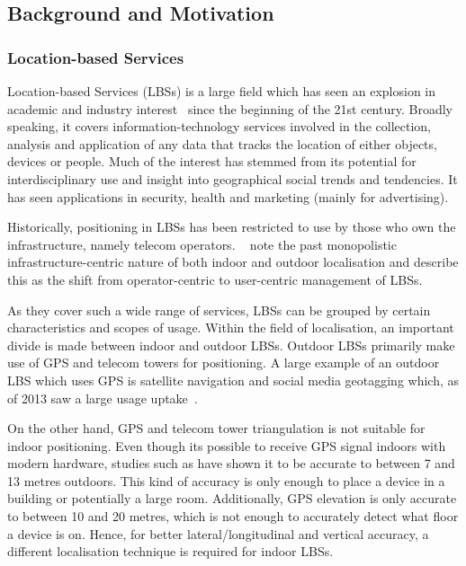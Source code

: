 
\subsection{Background and Motivation}\label{sec:motivation-and-background}

\subsubsection{Location-based Services}\label{sec:location-based-services}

Location-based Services (LBSs) is a large field which has seen an explosion in academic and industry interest~\cite{Junglas2008} since the beginning of the 21st century.
Broadly speaking, it covers information-technology services involved in the collection, analysis and application of any data that tracks the location of either objects, devices or people.
Much of the interest has stemmed from its potential for interdisciplinary use and insight into geographical social trends and tendencies.
It has seen applications in security, health and marketing (mainly for advertising).

Historically, positioning in LBSs has been restricted to use by those who own the infrastructure, namely telecom operators.
~ note the past monopolistic infrastructure-centric nature of both indoor and outdoor localisation and describe this as the shift from operator-centric to user-centric management of LBSs.

As they cover such a wide range of services, LBSs can be grouped by certain characteristics and scopes of usage.
Within the field of localisation, an important divide is made between indoor and outdoor LBSs.
Outdoor LBSs primarily make use of GPS and telecom towers for positioning.
A large example of an outdoor LBS which uses GPS is satellite navigation and social media geotagging which, as of 2013 saw a large usage uptake~\cite{zickuhr2013}.

On the other hand, GPS and telecom tower triangulation is not suitable for indoor positioning.
Even though its possible to receive GPS signal indoors with modern hardware, studies such as \cite{merry2019smartphone} have shown it to be accurate to between 7 and 13 metres outdoors.
This kind of accuracy is only enough to place a device in a building or potentially a large room.
Additionally, GPS elevation is only accurate to between 10 and 20 metres, which is not enough to accurately detect what floor a device is on.
Hence, for better lateral/longitudinal and vertical accuracy, a different localisation technique is required for indoor LBSs.

